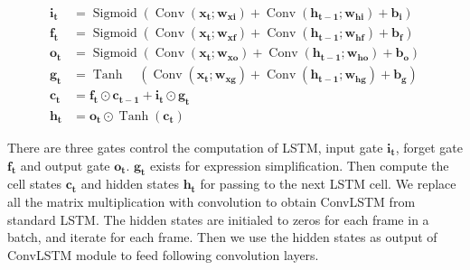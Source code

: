 \documentclass[final]{cvpr}
\begin{document}
\begin{equation}\label{convLSTM}
    \begin{aligned}
        \mathbf{i}_{\mathbf{t}} & = \operatorname{Sigmoid}\left(\operatorname{Conv}\left(\mathbf{x}_{\mathbf{t}} ; \mathbf{w}_{\mathbf{x i}}\right)+\operatorname{Conv}\left(\mathbf{h}_{\mathbf{t}-\mathbf{1}} ; \mathbf{w}_{\mathbf{h i}}\right)+\mathbf{b}_{\mathbf{i}}\right)    \\
        \mathbf{f}_{\mathbf{t}} & = \operatorname{Sigmoid}\left(\operatorname{Conv}\left(\mathbf{x}_{\mathbf{t}} ; \mathbf{w}_{\mathbf{x f}}\right)+\operatorname{Conv}\left(\mathbf{h}_{\mathbf{t}-\mathbf{1}} ; \mathbf{w}_{\mathbf{h f}}\right)+\mathbf{b}_{\mathbf{f}}\right)    \\
        \mathbf{o}_{\mathbf{t}} & = \operatorname{Sigmoid}\left(\operatorname{Conv}\left(\mathbf{x}_{\mathbf{t}} ; \mathbf{w}_{\mathbf{x o}}\right)+\operatorname{Conv}\left(\mathbf{h}_{\mathbf{t}-\mathbf{1}} ; \mathbf{w}_{\mathbf{h o}}\right)+\mathbf{b}_{\mathbf{o}}\right)    \\
        \mathbf{g}_{\mathbf{t}} & = \operatorname{Tanh} \quad\left(\operatorname{Conv}\left(\mathbf{x}_{\mathbf{t}} ; \mathbf{w}_{\mathbf{x g}}\right)+\operatorname{Conv}\left(\mathbf{h}_{\mathbf{t}-\mathbf{1}} ; \mathbf{w}_{\mathbf{h g}}\right)+\mathbf{b}_{\mathbf{g}}\right) \\
        \mathbf{c}_{\mathbf{t}} & = \mathbf{f}_{\mathbf{t}} \odot \mathbf{c}_{\mathbf{t}-\mathbf{1}}+\mathbf{i}_{\mathbf{t}} \odot \mathbf{g}_{\mathbf{t}}                                                                                                                           \\
        \mathbf{h}_{\mathbf{t}} & = \mathbf{o}_{\mathbf{t}} \odot \operatorname{Tanh}\left(\mathbf{c}_{\mathbf{t}}\right)
    \end{aligned}
\end{equation}

There are three gates control the computation of LSTM, input gate $\mathbf{i}_{\mathbf{t}}$, forget gate $\mathbf{f}_{\mathbf{t}}$ and output gate $\mathbf{o}_{\mathbf{t}}$. $\mathbf{g}_{\mathbf{t}}$ exists for expression simplification.
Then compute the cell states $\mathbf{c}_{\mathbf{t}}$ and hidden states $\mathbf{h}_{\mathbf{t}}$ for passing to the next LSTM cell.
We replace all the matrix multiplication with convolution to obtain ConvLSTM from standard LSTM.
The hidden states are initialed to zeros for each frame in a batch, and iterate for each frame.
Then we use the hidden states as output of ConvLSTM module to feed following convolution layers.
\end{document}
